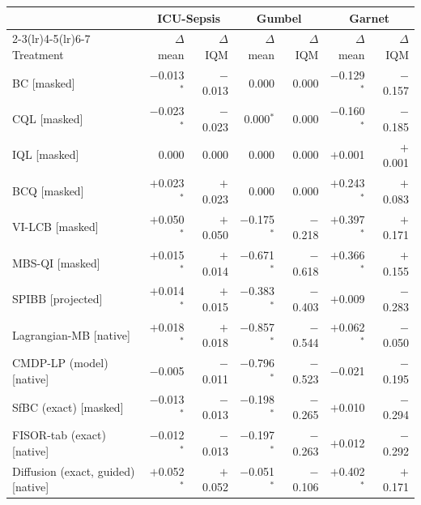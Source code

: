 \begin{tabular}{lrrrrrr}
\toprule
 & \multicolumn{2}{c}{ICU-Sepsis} & \multicolumn{2}{c}{Gumbel} & \multicolumn{2}{c}{Garnet} \\
\cmidrule(lr){2-3}\cmidrule(lr){4-5}\cmidrule(lr){6-7}
Treatment & $\Delta$ mean & $\Delta$ IQM & $\Delta$ mean & $\Delta$ IQM & $\Delta$ mean & $\Delta$ IQM \\
\midrule
BC [masked] & $-$0.013$^{*}$ & $-$0.013 & 0.000 & 0.000 & $-$0.129$^{*}$ & $-$0.157 \\
CQL [masked] & $-$0.023$^{*}$ & $-$0.023 & 0.000$^{*}$ & 0.000 & $-$0.160$^{*}$ & $-$0.185 \\
IQL [masked] & 0.000 & 0.000 & 0.000 & 0.000 & $+$0.001 & $+$0.001 \\
BCQ [masked] & $+$0.023$^{*}$ & $+$0.023 & 0.000 & 0.000 & $+$0.243$^{*}$ & $+$0.083 \\
VI-LCB [masked] & $+$0.050$^{*}$ & $+$0.050 & $-$0.175$^{*}$ & $-$0.218 & $+$0.397$^{*}$ & $+$0.171 \\
MBS-QI [masked] & $+$0.015$^{*}$ & $+$0.014 & $-$0.671$^{*}$ & $-$0.618 & $+$0.366$^{*}$ & $+$0.155 \\
SPIBB [projected] & $+$0.014$^{*}$ & $+$0.015 & $-$0.383$^{*}$ & $-$0.403 & $+$0.009 & $-$0.283 \\
Lagrangian-MB [native] & $+$0.018$^{*}$ & $+$0.018 & $-$0.857$^{*}$ & $-$0.544 & $+$0.062$^{*}$ & $-$0.050 \\
CMDP-LP (model) [native] & $-$0.005 & $-$0.011 & $-$0.796$^{*}$ & $-$0.523 & $-$0.021 & $-$0.195 \\
SfBC (exact) [masked] & $-$0.013$^{*}$ & $-$0.013 & $-$0.198$^{*}$ & $-$0.265 & $+$0.010 & $-$0.294 \\
FISOR-tab (exact) [native] & $-$0.012$^{*}$ & $-$0.013 & $-$0.197$^{*}$ & $-$0.263 & $+$0.012 & $-$0.292 \\
Diffusion (exact, guided) [native] & $+$0.052$^{*}$ & $+$0.052 & $-$0.051$^{*}$ & $-$0.106 & $+$0.402$^{*}$ & $+$0.171 \\
\bottomrule
\end{tabular}
